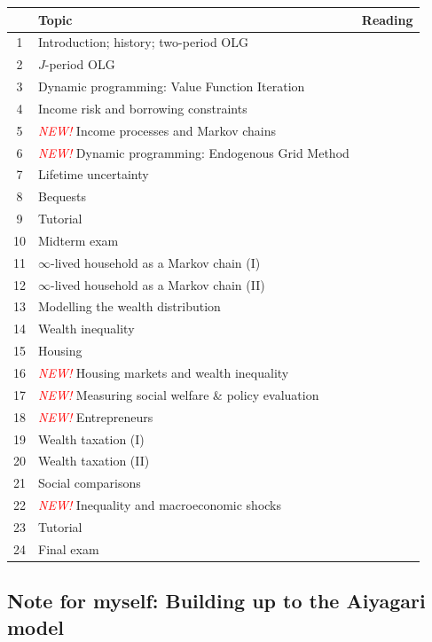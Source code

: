 \documentclass[a4paper, 11pt]{article}
\newcommand{\red}{\textcolor{red}}
\newcommand{\new}{\red{\emph{NEW!}} }
\begin{document}
\begin{tabular}{@{}c>{\raggedright\arraybackslash}p{8cm}>{\raggedright\arraybackslash}p{6.5cm}@{}}
\toprule
  & Topic & Reading \\
\midrule
1 & Introduction; history; two-period OLG & \citet{jappelli2017economics} \\
2 & $J$-period OLG &  \citet{jappelli2017economics} \\
3 & Dynamic programming: Value Function Iteration \\
4 & Income risk and borrowing constraints & \citet{jappelli2017economics} \\
5 & \new Income processes and Markov chains \\
6 & \new Dynamic programming: Endogenous Grid Method \\
7 & Lifetime uncertainty & \citet{jappelli2017economics} \\
8 & Bequests & \citet{jappelli2017economics}  \\ \midrule
9 & Tutorial &  \\
10 & Midterm exam \\ \midrule
11 & $\infty$-lived household as a Markov chain (I) \\
12 & $\infty$-lived household as a Markov chain (II) \\
13 & Modelling the wealth distribution \\
14 & Wealth inequality & \citet{hubmer2021sources} \\
15 & Housing &  \\
16 & \new Housing markets and wealth inequality & \citet{huber2025rental}  \\
17 & \new Measuring social welfare \& policy evaluation \\
18 & \new Entrepreneurs \\
19 & Wealth taxation (I) & \citet{guvenen2023use} \\
20 & Wealth taxation (II) & \citet{boar2023income-or-wealth} \\

21 & Social comparisons & \citet{drechsel2025falling-behind} \\
22 & \new Inequality and macroeconomic shocks & \citet{kaplan2018microeconomic} \\ \midrule
23 & Tutorial \\
24 & Final exam \\
\bottomrule
\end{tabular}

\subsection*{Note for myself: Building up to the Aiyagari model}
\end{document}
